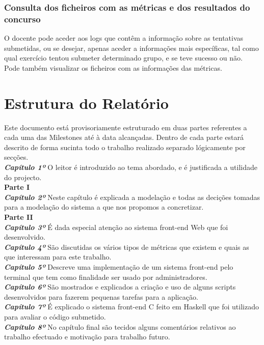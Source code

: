 \subsubsection{Consulta dos ficheiros com as métricas e dos resultados do concurso}
O docente pode aceder aos logs que contêm a informação sobre as tentativas submetidas, ou se desejar, apenas aceder a informações mais específicas, tal como 
qual exercício tentou submeter determinado grupo, e se teve sucesso ou não.\\
Pode também visualizar os ficheiros com as informações das métricas.

\section{Estrutura do Relatório}
Este documento está provisoriamente estruturado em duas partes referentes a cada uma das Milestones até à data alcançadas. Dentro de cada parte estará descrito de forma
sucinta todo o trabalho realizado separado lógicamente por secções.\\

\textbf{\textit{Capítulo 1º}} O leitor é introduzido ao tema abordado, e é justificada a utilidade do projecto.\\

\textbf{Parte I}\\

\textbf{\textit{Capítulo 2º}} Neste capítulo é explicada a modelação e todas as decições tomadas para a modelação do sistema a que nos propomos a concretizar.\\

\textbf{Parte II}\\

\textbf{\textit{Capítulo 3º}} É dada especial atenção ao sistema front-end Web que foi desenvolvido.\\

\textbf{\textit{Capítulo 4º}} São discutidas os vários tipos de métricas que existem e quais as que interessam para este trabalho.\\

\textbf{\textit{Capítulo 5º}} Descreve uma implementação de um sistema front-end pelo terminal que tem como finalidade ser usado por administradores.\\

\textbf{\textit{Capítulo 6º}} São mostrados e explicados a criação e uso de alguns scripts desenvolvidos para fazerem pequenas tarefas para a aplicação.\\

\textbf{\textit{Capítulo 7º}} É explicado o sistema front-end C feito em Haskell que foi utilizado para avaliar o código submetido.\\

\textbf{\textit{Capítulo 8º}} No capítulo final são tecidos alguns comentários relativos ao trabalho efectuado e motivação para trabalho futuro.\\

